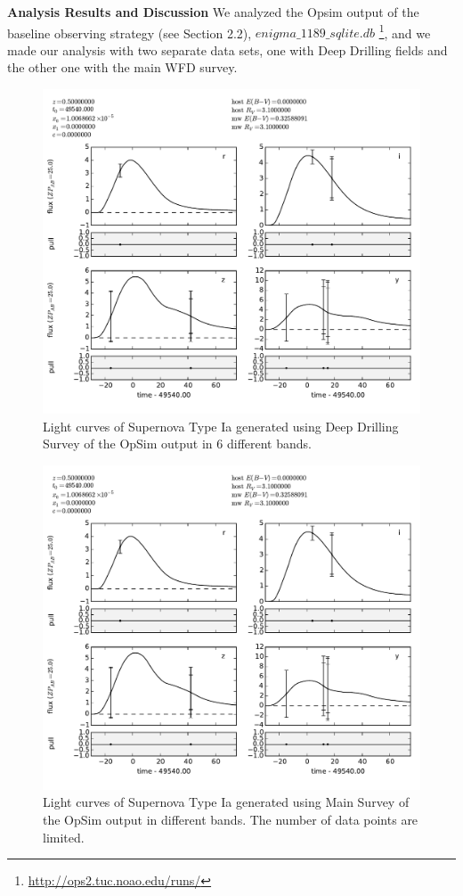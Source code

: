 {\bf Analysis Results and Discussion}
We analyzed the Opsim output of the baseline observing strategy (see Section 2.2),
$enigma\_1189\_sqlite.db$ {\footnote {\url{http://ops2.tuc.noao.edu/runs/}}}, and 
we made our analysis with two separate data sets, one with Deep Drilling fields and the other one with the main WFD survey.

\begin{figure}[tbh!]
\includegraphics[angle=0,width=0.99\hsize:,clip]{figs/SN_309_lc.pdf}
\caption{Light curves of Supernova Type Ia generated using Deep Drilling Survey of the OpSim output in 6 different bands.
}
\label{fig:SNIaLCopsimdeep}
\end{figure}



\begin{figure}[tbh!]
\includegraphics[angle=0,width=0.99\hsize:,clip]{figs/SN_309_lc.pdf}
\caption{Light curves of Supernova Type Ia generated using Main Survey of the OpSim output in different bands. The number of data points are limited. 
}
\label{fig:SNIaLCopsimmain}
\end{figure}



